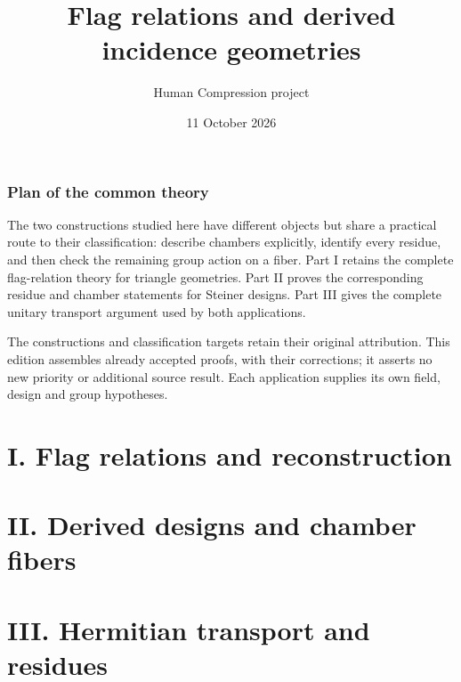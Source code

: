 \documentclass[
  11pt,
  a4paper,
]{article}
\title{Flag relations and derived incidence geometries}
\author{Human Compression project}
\date{11 October 2026}
\begin{document}
\maketitle
\section*{Plan of the common theory}
The two constructions studied here have different objects but share a practical route to their classification: describe chambers explicitly, identify every residue, and then check the remaining group action on a fiber. Part I retains the complete flag-relation theory for triangle geometries. Part II proves the corresponding residue and chamber statements for Steiner designs. Part III gives the complete unitary transport argument used by both applications.

The constructions and classification targets retain their original attribution. This edition assembles already accepted proofs, with their corrections; it asserts no new priority or additional source result. Each application supplies its own field, design and group hypotheses.
\part*{I. Flag relations and reconstruction}

\part*{II. Derived designs and chamber fibers}

\part*{III. Hermitian transport and residues}

\end{document}
